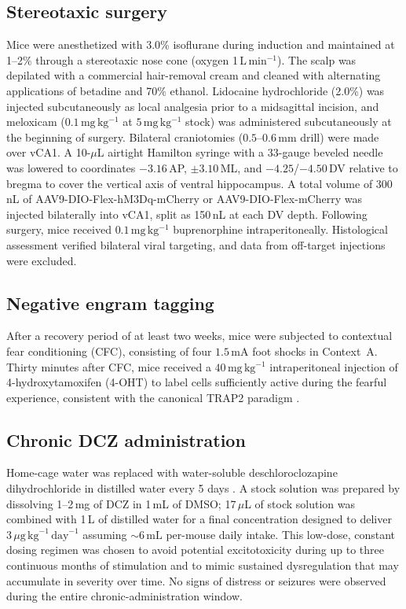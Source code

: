 \documentclass[11pt]{article}
\begin{document}
\subsection{Stereotaxic surgery}
Mice were anesthetized with 3.0\% isoflurane during induction and maintained at 1--2\% through a stereotaxic nose cone (oxygen 1\,L\,min$^{-1}$). The scalp was depilated with a commercial hair-removal cream and cleaned with alternating applications of betadine and 70\% ethanol. Lidocaine hydrochloride (2.0\%) was injected subcutaneously as local analgesia prior to a midsagittal incision, and meloxicam ($0.1\,\mathrm{mg\,kg^{-1}}$ at $5\,\mathrm{mg\,kg^{-1}}$ stock) was administered subcutaneously at the beginning of surgery. Bilateral craniotomies ($0.5$--$0.6\,\mathrm{mm}$ drill) were made over vCA1. A 10-$\mu$L airtight Hamilton syringe with a 33-gauge beveled needle was lowered to coordinates $-3.16$\,AP, $\pm 3.10$\,ML, and $-4.25$/$-4.50$\,DV relative to bregma to cover the vertical axis of ventral hippocampus. A total volume of 300\,nL of AAV9-DIO-Flex-hM3Dq-mCherry or AAV9-DIO-Flex-mCherry was injected bilaterally into vCA1, split as 150\,nL at each DV depth. Following surgery, mice received $0.1\,\mathrm{mg\,kg^{-1}}$ buprenorphine intraperitoneally. Histological assessment verified bilateral viral targeting, and data from off-target injections were excluded.

\subsection{Negative engram tagging}
After a recovery period of at least two weeks, mice were subjected to contextual fear conditioning (CFC), consisting of four $1.5\,\mathrm{mA}$ foot shocks in Context~A. Thirty minutes after CFC, mice received a $40\,\mathrm{mg\,kg^{-1}}$ intraperitoneal injection of 4-hydroxytamoxifen (4-OHT) to label cells sufficiently active during the fearful experience, consistent with the canonical TRAP2 paradigm \citep{denardo2019temporal}.

\subsection{Chronic DCZ administration}
Home-cage water was replaced with water-soluble deschloroclozapine dihydrochloride in distilled water every 5 days \citep{nagai2020dcz,roth2016dreadds}. A stock solution was prepared by dissolving 1--2\,mg of DCZ in 1\,mL of DMSO; 17\,$\mu$L of stock solution was combined with 1\,L of distilled water for a final concentration designed to deliver $3\,\mu\mathrm{g}\,\mathrm{kg}^{-1}\,\mathrm{day}^{-1}$ assuming $\sim\!6\,\mathrm{mL}$ per-mouse daily intake. This low-dose, constant dosing regimen was chosen to avoid potential excitotoxicity during up to three continuous months of stimulation and to mimic sustained dysregulation that may accumulate in severity over time. No signs of distress or seizures were observed during the entire chronic-administration window.
\end{document}

